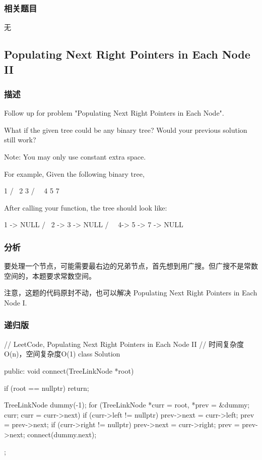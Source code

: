 \subsubsection{相关题目}
\begindot
\item 无
\myenddot


\subsection{Populating Next Right Pointers in Each Node II} %
\label{sec:populating-next-right-pointers-in-each-node-ii}


\subsubsection{描述}
Follow up for problem "Populating Next Right Pointers in Each Node".

What if the given tree could be any binary tree? Would your previous solution still work?

Note: You may only use constant extra space.

For example,
Given the following binary tree,
\begin{Code}
         1
       /  \
      2    3
     / \    \
    4   5    7
\end{Code}

After calling your function, the tree should look like:
\begin{Code}
         1 -> NULL
       /  \
      2 -> 3 -> NULL
     / \    \
    4-> 5 -> 7 -> NULL
\end{Code}


\subsubsection{分析}
要处理一个节点，可能需要最右边的兄弟节点，首先想到用广搜。但广搜不是常数空间的，本题要求常数空间。

注意，这题的代码原封不动，也可以解决 Populating Next Right Pointers in Each Node I.


\subsubsection{递归版}
\begin{Code}
// LeetCode, Populating Next Right Pointers in Each Node II
// 时间复杂度O(n)，空间复杂度O(1)
class Solution {
public:
    void connect(TreeLinkNode *root) {
        if (root == nullptr) return;

        TreeLinkNode dummy(-1);
        for (TreeLinkNode *curr = root, *prev = &dummy; 
                curr; curr = curr->next) {
            if (curr->left != nullptr){
                prev->next = curr->left;
                prev = prev->next;
            }
            if (curr->right != nullptr){
                prev->next = curr->right;
                prev = prev->next;
            }
        }
        connect(dummy.next);
    }
};
\end{Code}


